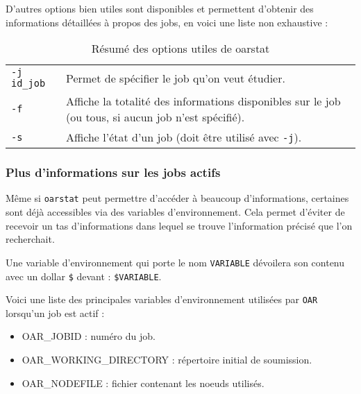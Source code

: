 \par D'autres options bien utiles sont disponibles et permettent d'obtenir des informations détaillées à propos des jobs, en voici une liste non exhaustive : \\

\begin{table}[h!]
  \centering

  \begin{tabular}{ll}
    \texttt{-j id\_job} & Permet de spécifier le job qu'on veut étudier. \\
    \texttt{-f} & Affiche la totalité des informations disponibles sur le job (ou tous, si aucun job n'est spécifié).\\
    \texttt{-s} & Affiche l'état d'un job (doit être utilisé avec \texttt{-j}).\\
  \end{tabular}

  \caption{Résumé des options utiles de oarstat}
  
\end{table}


\subsubsection{Plus d'informations sur les jobs actifs}
\label{sec:plus-dinf-sur}

\par Même si \texttt{oarstat} peut permettre d'accéder à beaucoup d'informations, certaines sont déjà accessibles via des variables d'environnement. Cela permet d'éviter de recevoir un tas d'informations dans lequel se trouve l'information précisé que l'on recherchait.

\par Une variable d'environnement qui porte le nom \texttt{VARIABLE} dévoilera son contenu avec un dollar \texttt{\$} devant : \texttt{\$VARIABLE}.

\par Voici une liste des principales variables d'environnement utilisées par \texttt{OAR} lorsqu'un job est actif :
\begin{itemize}
\item OAR\_JOBID : numéro du job.
\item OAR\_WORKING\_DIRECTORY : répertoire initial de soumission.
\item OAR\_NODEFILE : fichier contenant les noeuds utilisés. 
\end{itemize}


